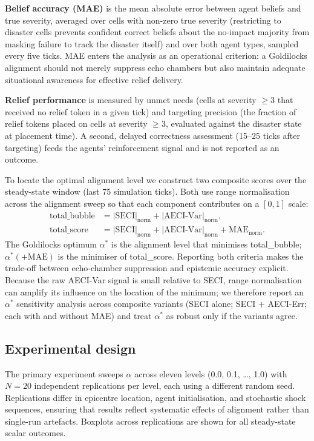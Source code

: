\documentclass[pdflatex,sn-basic]{sn-jnl}
\begin{document}
\textbf{Belief accuracy (MAE)} is the mean absolute error between agent beliefs and true severity, averaged over cells with non-zero true severity (restricting to disaster cells prevents confident correct beliefs about the no-impact majority from masking failure to track the disaster itself) and over both agent types, sampled every five ticks. MAE enters the analysis as an operational criterion: a Goldilocks alignment should not merely suppress echo chambers but also maintain adequate situational awareness for effective relief delivery.

\textbf{Relief performance} is measured by unmet needs (cells at severity $\geq 3$ that received no relief token in a given tick) and targeting precision (the fraction of relief tokens placed on cells at severity $\geq 3$, evaluated against the disaster state at placement time). A second, delayed correctness assessment (15--25 ticks after targeting) feeds the agents' reinforcement signal and is not reported as an outcome.

To locate the optimal alignment level we construct two composite scores over the steady-state window (last 75 simulation ticks). Both use range normalisation across the alignment sweep so that each component contributes on a $[0, 1]$ scale:
\begin{align}
\text{total\_bubble} &= |\text{SECI}|_{\text{norm}} + |\text{AECI-Var}|_{\text{norm}}, \label{eq:bubble}\\
\text{total\_score} &= |\text{SECI}|_{\text{norm}} + |\text{AECI-Var}|_{\text{norm}} + \text{MAE}_{\text{norm}}. \label{eq:score}
\end{align}
The Goldilocks optimum $\alpha^{*}$ is the alignment level that minimises total\_bubble; $\alpha^{*}(+\text{MAE})$ is the minimiser of total\_score. Reporting both criteria makes the trade-off between echo-chamber suppression and epistemic accuracy explicit. Because the raw AECI-Var signal is small relative to SECI, range normalisation can amplify its influence on the location of the minimum; we therefore report an $\alpha^{*}$ sensitivity analysis across composite variants (SECI alone; SECI + AECI-Err; each with and without MAE) and treat $\alpha^{*}$ as robust only if the variants agree.

\subsection{Experimental design}\label{sec:design}

The primary experiment sweeps $\alpha$ across eleven levels (0.0, 0.1, \ldots, 1.0) with $N = 20$ independent replications per level, each using a different random seed. Replications differ in epicentre location, agent initialisation, and stochastic shock sequences, ensuring that results reflect systematic effects of alignment rather than single-run artefacts. Boxplots across replications are shown for all steady-state scalar outcomes.
\end{document}
